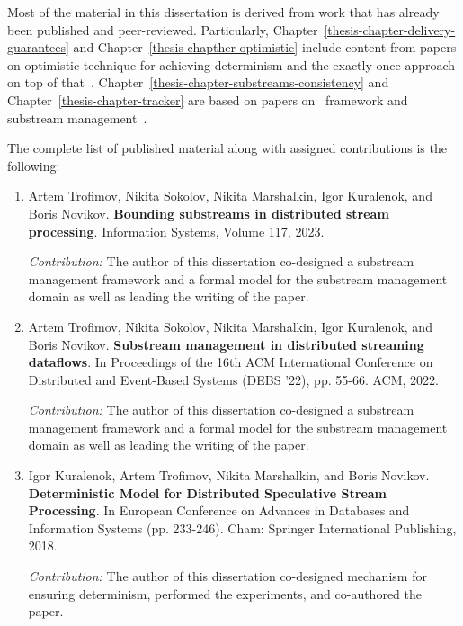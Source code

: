 Most of the material in this dissertation is derived from work that has already been published and peer-reviewed. Particularly, Chapter~\ref{thesis-chapter-delivery-guarantees} and Chapter~\ref{thesis-chapther-optimistic} include content from papers on optimistic technique for achieving determinism and the exactly-once approach on top of that~\cite{we2018seim, we2018adbis, thepaper, we2018beyondmr, trofimov2018consistency, webirte, we2019debs}. Chapter~\ref{thesis-chapter-substreams-consistency} and Chapter~\ref{thesis-chapter-tracker} are based on papers on \tracker\ framework and substream management~\cite{10.1145/3524860.3539809, trofimov2023bounding}.

The complete list of published material along with assigned contributions is the following:

\begin{enumerate}
    \item Artem Trofimov, Nikita Sokolov, Nikita Marshalkin, Igor Kuralenok, and Boris Novikov. \textbf{Bounding substreams in distributed stream processing}. Information Systems, Volume 117, 2023. \newline
    
    \textit{Contribution:} The author of this dissertation co-designed a substream management framework and a formal model for the substream management domain as well as leading the writing of the paper.

    \item Artem Trofimov, Nikita Sokolov, Nikita Marshalkin, Igor Kuralenok, and Boris Novikov. \textbf{Substream management in distributed streaming dataflows}. In Proceedings of the 16th ACM International Conference on Distributed and Event-Based Systems (DEBS '22), pp. 55-66. ACM, 2022. \newline
    
    \textit{Contribution:} The author of this dissertation co-designed a substream management framework and a formal model for the substream management domain as well as leading the writing of the paper.

    \item Igor Kuralenok, Artem Trofimov, Nikita Marshalkin, and Boris Novikov. \textbf{Deterministic Model for Distributed Speculative Stream Processing}. In European Conference on Advances in Databases and Information Systems (pp. 233-246). Cham: Springer International Publishing, 2018. \newline
    
    \textit{Contribution:} The author of this dissertation co-designed mechanism for ensuring determinism, performed the experiments, and co-authored the paper.


\end{enumerate}
